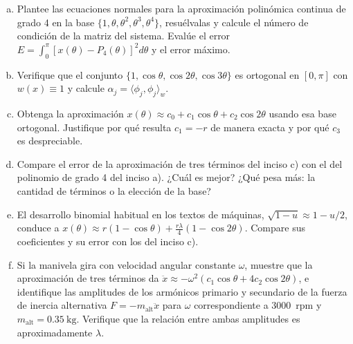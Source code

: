 \documentclass[11pt]{article}
\begin{document}
\begin{question}
	\begin{enumerate}[a)]
		\item Plantee las ecuaciones normales para la aproximación polinómica continua de grado 4 en la base $\{1, \theta, \theta^2, \theta^3, \theta^4\}$, resuélvalas y calcule el número de condición de la matriz del sistema. Evalúe el error $E = \int_0^{\pi} [x(\theta) - P_4(\theta)]^2 d\theta$ y el error máximo.
		\item Verifique que el conjunto $\{1, \cos \theta, \cos 2\theta, \cos 3\theta \}$ es ortogonal en $[0, \pi]$ con $w(x) \equiv 1$ y calcule $\alpha_j = \langle \phi_j, \phi_j \rangle_w$.
		\item Obtenga la aproximación $x(\theta) \approx c_0 + c_1 \cos \theta + c_2 \cos 2 \theta$ usando esa base ortogonal. Justifique por qué resulta $c_1 = -r$ de manera exacta y por qué $c_3$ es despreciable.
		\item Compare el error de la aproximación de tres términos del inciso c) con el del polinomio de grado 4 del inciso a). ¿Cuál es mejor? ¿Qué pesa más: la cantidad de términos o la elección de la base?
		\item El desarrollo binomial habitual en los textos de máquinas, $\sqrt{1-u} \approx 1 - u/2$, conduce a $x(\theta) \approx r(1 - \cos \theta) + \frac{r \lambda}{4}(1 - \cos 2 \theta)$. Compare sus coeficientes y su error con los del inciso c).
		\item Si la manivela gira con velocidad angular constante $\omega$, muestre que la aproximación de tres términos da $\ddot{x} \approx -\omega^2 (c_1 \cos \theta + 4 c_2 \cos 2 \theta)$, e identifique las amplitudes de los armónicos primario y secundario de la fuerza de inercia alternativa $F = -m_{\text{alt}} \ddot{x}$ para $\omega$ correspondiente a \qty{3000}{rpm} y $m_{\text{alt}} = \qty{0.35}{\kilo\gram}$. Verifique que la relación entre ambas amplitudes es aproximadamente $\lambda$.
	\end{enumerate}
\end{question}
\end{document}
